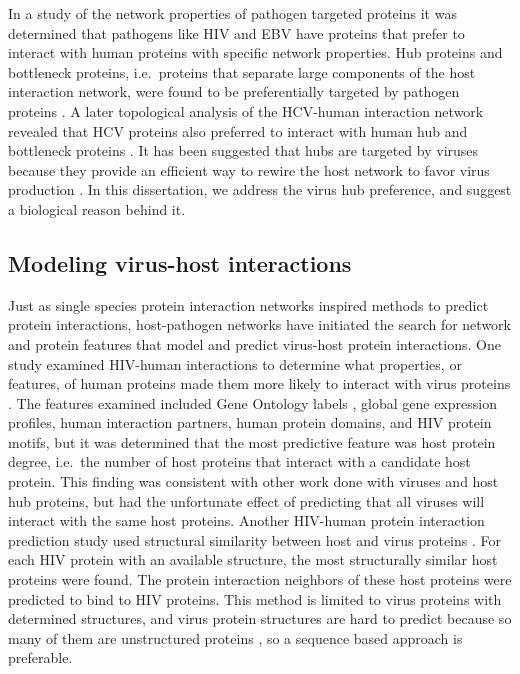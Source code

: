 In a study of the network properties of pathogen targeted proteins it
was determined that pathogens like HIV and EBV have proteins that
prefer to interact with human proteins with specific network
properties. Hub proteins and bottleneck proteins, i.e.\ proteins that
separate large components of the host interaction network, were found
to be preferentially targeted by pathogen proteins \cite{dyer08}. A
later topological analysis of the HCV-human interaction network
revealed that HCV proteins also preferred to interact with human hub
and bottleneck proteins \cite{dechassey08}. It has been suggested that
hubs are targeted by viruses because they provide an efficient way to
rewire the host network to favor virus production
\cite{calderwood07}. In this dissertation, we address the virus hub
preference, and suggest a biological reason behind it.


\subsection{Modeling virus-host interactions}

Just as single species protein interaction networks inspired methods
to predict protein interactions, host-pathogen networks have initiated
the search for network and protein features that model and predict
virus-host protein interactions. One study examined HIV-human
interactions to determine what properties, or features, of human
proteins made them more likely to interact with virus proteins
\cite{tastan09}. The features examined included Gene Ontology labels
\cite{ashburner00}, global gene expression profiles, human interaction
partners, human protein domains, and HIV protein motifs, but it was
determined that the most predictive feature was host protein degree,
i.e.\ the number of host proteins that interact with a candidate host
protein. This finding was consistent with other work done with viruses
and host hub proteins, but had the unfortunate effect of predicting
that all viruses will interact with the same host proteins. Another
HIV-human protein interaction prediction study used structural
similarity between host and virus proteins
\cite{doolittle2010structural}. For each HIV protein with an available
structure, the most structurally similar host proteins were found. The
protein interaction neighbors of these host proteins were predicted to
bind to HIV proteins. This method is limited to virus proteins with
determined structures, and virus protein structures are hard to
predict because so many of them are unstructured proteins
\cite{tokuriki2009viral}, so a sequence based approach is preferable.

